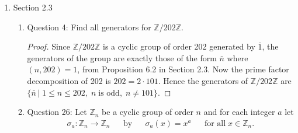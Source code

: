 \documentclass{article}
\begin{document}
\begin{enumerate}
\begin{enumerate}
\begin{proof}
          The map $\theta$ from $F$ to $H(F)$ which sends $f\in F$ to
          \begin{align*}
            \begin{array}{*{3}c}
              1 & 0 & f \\
              0 & 1 & 0 \\
              0 & 0 & 1 \\
            \end{array}
          \end{align*}
          can be shown to be a homomorphism:
          $\theta(f_1+f_2)=\theta(f_1)\theta(f_2)$. The map is injective
          and has image $Z(H(F))$, hence $F$ under the addition operation
          isomorphic to $Z(H(F))$ as groups.
        \end{proof}
    \end{enumerate}

  \item Section 2.3
    \begin{enumerate}
      \item Question 4: Find all generators for $\mathbb{Z}/202\mathbb{Z}$.
        \begin{proof}
          Since $\mathbb{Z}/202\mathbb{Z}$ is a cyclic group of order 202
          generated by $\bar{1}$, the generators of the group are exactly
          those of the form $\bar{n}$ where $(n,202)=1$, from
          Proposition 6.2 in Section 2.3. Now the prime factor
          decomposition of 202 is $202=2\cdot 101$. Hence the generators of
          $\mathbb{Z}/202\mathbb{Z}$ are
          $\{\bar{n}\,|\; 1\leq n\leq 202,\; n\;\text{is odd},\;n\neq101\}$.
        \end{proof}

      \item Question 26: Let $\mathbb{Z}_n$ be a cyclic group of order $n$
        and for each integer $a$ let
        \begin{align*}
          \sigma_a:\mathbb{Z}_n\rightarrow\mathbb{Z}_n  && \text{by}  &&
          \sigma_a(x)=x^a && \text{for all}\; x\in\mathbb{Z}_n.
        \end{align*}


\end{enumerate}
\end{enumerate}
\end{document}
